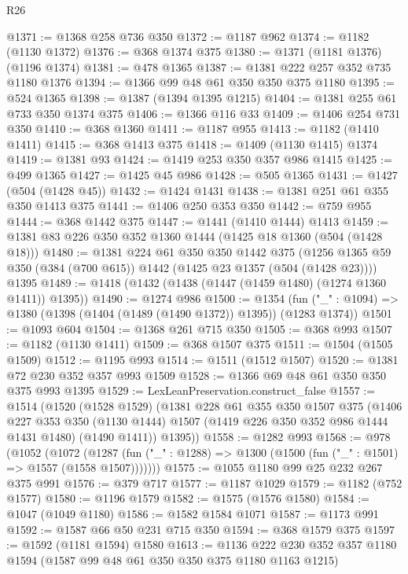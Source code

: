 \begin{lexlean}{R26}
\begin{coremodule}
@1371 := @1368 @258 @736 @350
@1372 := @1187 @962
@1374 := @1182 (@1130 @1372)
@1376 := @368 @1374 @375
@1380 := @1371 (@1181 @1376) (@1196 @1374)
@1381 := @478 @1365
@1387 := @1381 @222 @257 @352 @735 @1180 @1376
@1394 := @1366 @99 @48 @61 @350 @350 @375 @1180
@1395 := @524 @1365
@1398 := @1387 (@1394 @1395 @1215)
@1404 := @1381 @255 @61 @733 @350 @1374 @375
@1406 := @1366 @116 @33
@1409 := @1406 @254 @731 @350
@1410 := @368 @1360
@1411 := @1187 @955
@1413 := @1182 (@1410 @1411)
@1415 := @368 @1413 @375
@1418 := @1409 (@1130 @1415) @1374
@1419 := @1381 @93
@1424 := @1419 @253 @350 @357 @986 @1415
@1425 := @499 @1365
@1427 := @1425 @45 @986
@1428 := @505 @1365
@1431 := @1427 (@504 (@1428 @45))
@1432 := @1424 @1431
@1438 := @1381 @251 @61 @355 @350 @1413 @375
@1441 := @1406 @250 @353 @350
@1442 := @759 @955
@1444 := @368 @1442 @375
@1447 := @1441 (@1410 @1444) @1413
@1459 := @1381 @83 @226 @350 @352 @1360 @1444 (@1425 @18 @1360 (@504 (@1428 @18)))
@1480 := @1381
    @224
    @61
    @350
    @350
    @1442
    @375
    (@1256 @1365 @59 @350 (@384 (@700 @615)) @1442 (@1425 @23 @1357 (@504 (@1428 @23))))
    @1395
@1489 := @1418 (@1432 (@1438 (@1447 (@1459 @1480) (@1274 @1360 @1411)) @1395))
@1490 := @1274 @986
@1500 := @1354
    (fun ("_" : @1094) => @1380 (@1398 (@1404 (@1489 (@1490 @1372)) @1395)) (@1283 @1374))
@1501 := @1093 @604
@1504 := @1368 @261 @715 @350
@1505 := @368 @993
@1507 := @1182 (@1130 @1411)
@1509 := @368 @1507 @375
@1511 := @1504 (@1505 @1509)
@1512 := @1195 @993
@1514 := @1511 (@1512 @1507)
@1520 := @1381 @72 @230 @352 @357 @993 @1509
@1528 := @1366 @69 @48 @61 @350 @350 @375 @993 @1395
@1529 := LexLeanPreservation.construct_false
@1557 := @1514
    (@1520
      (@1528 @1529)
      (@1381
        @228
        @61
        @355
        @350
        @1507
        @375
        (@1406
          @227
          @353
          @350
          (@1130 @1444)
          @1507
          (@1419 @226 @350 @352 @986 @1444 @1431 @1480)
          (@1490 @1411))
        @1395))
@1558 := @1282 @993
@1568 := @978
    (@1052
      (@1072
        (@1287 (fun ("_" : @1288) => @1300 (@1500 (fun ("_" : @1501) => @1557 (@1558 @1507)))))))
@1575 := @1055 @1180 @99 @25 @232 @267 @375 @991
@1576 := @379 @717
@1577 := @1187 @1029
@1579 := @1182 (@752 @1577)
@1580 := @1196 @1579
@1582 := @1575 (@1576 @1580)
@1584 := @1047 (@1049 @1180)
@1586 := @1582 @1584 @1071
@1587 := @1173 @991
@1592 := @1587 @66 @50 @231 @715 @350
@1594 := @368 @1579 @375
@1597 := @1592 (@1181 @1594) @1580
@1613 := @1136 @222 @230 @352 @357 @1180 @1594 (@1587 @99 @48 @61 @350 @350 @375 @1180 @1163 @1215)

\end{coremodule}
\end{lexlean}
